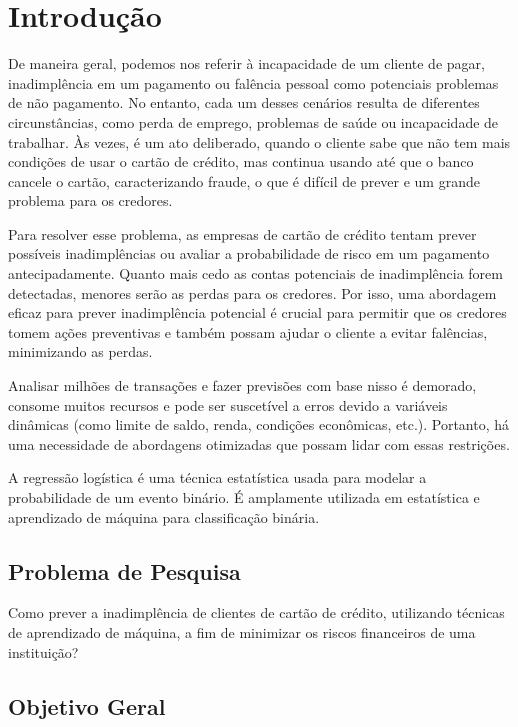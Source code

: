 \documentclass{abntpuc}
\author         {Gabriel Machado \\ João Pedro Garcia \\ Matheus Lopes \\ Miguel Battendieri \\ Pedro Vendrametto}
\begin{document}
\capa

\folharosto

\sumario

\chapter{Introdução}

De maneira geral, podemos nos referir à incapacidade de um cliente de pagar, inadimplência em um pagamento ou falência pessoal como potenciais problemas de não pagamento. No entanto, cada um desses cenários resulta de diferentes circunstâncias, como perda de emprego, problemas de saúde ou incapacidade de trabalhar. Às vezes, é um ato deliberado, quando o cliente sabe que não tem mais condições de usar o cartão de crédito, mas continua usando até que o banco cancele o cartão, caracterizando fraude, o que é difícil de prever e um grande problema para os credores.

Para resolver esse problema, as empresas de cartão de crédito tentam prever possíveis inadimplências ou avaliar a probabilidade de risco em um pagamento antecipadamente. Quanto mais cedo as contas potenciais de inadimplência forem detectadas, menores serão as perdas para os credores. Por isso, uma abordagem eficaz para prever inadimplência potencial é crucial para permitir que os credores tomem ações preventivas e também possam ajudar o cliente a evitar falências, minimizando as perdas.

Analisar milhões de transações e fazer previsões com base nisso é demorado, consome muitos recursos e pode ser suscetível a erros devido a variáveis dinâmicas (como limite de saldo, renda, condições econômicas, etc.). Portanto, há uma necessidade de abordagens otimizadas que possam lidar com essas restrições.

A regressão logística é uma técnica estatística usada para modelar a probabilidade de um evento binário. É amplamente utilizada em estatística e aprendizado de máquina para classificação binária.

\section{Problema de Pesquisa}

Como prever a inadimplência de clientes de cartão de crédito, utilizando técnicas de aprendizado de máquina, a fim de minimizar os riscos financeiros de uma instituição?

\section{Objetivo Geral}
\end{document}
